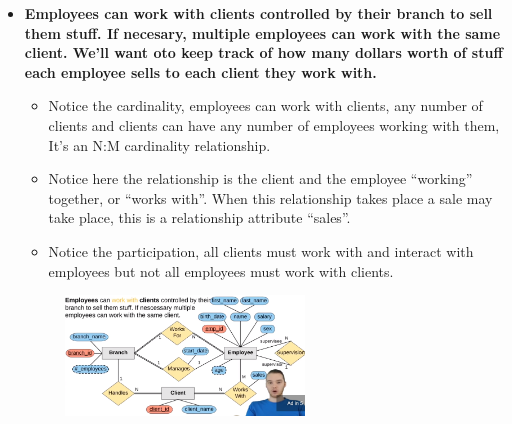 \begin{itemize}
    \item \textbf{Employees can work with clients controlled by their branch to sell them stuff. If necesary, multiple employees can work with the same client. We'll want oto keep track of how many dollars worth of stuff each employee sells to each client they work with.}
        \begin{itemize}
            \item Notice the cardinality, employees can work with clients, any number of clients and clients can have any number of employees working with them, It's an N:M cardinality relationship.
            \item Notice here the relationship is the client and the employee ``working'' together, or ``works with''. When this relationship takes place a sale may take place, this is a relationship attribute ``sales''.
            \item Notice the participation, all clients must work with and interact with employees but not all employees must work with clients.
        \end{itemize}
        \begin{figure}[H]
            \centering
            \includegraphics[width=0.6\textwidth]{./Figs/2020-12-24-00-39-58.png}
        \end{figure}


\end{itemize}
